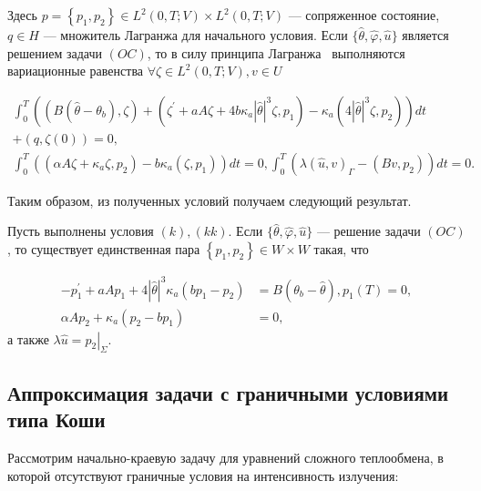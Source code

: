 Здесь $p=\left\{p_{1}, p_{2}\right\} \in L^{2}(0, T; V) \times L^{2}(0, T; V) $
— сопряженное состояние, $q \in H$ — множитель Лагранжа для начального условия.
Если $\{\widehat{\theta}, \widehat{\varphi}, \widehat{u}\}$
является решением задачи $(OC)$, то в силу принципа
Лагранжа~\cite[гл. 2, теорема 1.5]{10} выполняются вариационные равенства
$\forall \zeta \in L^{2}(0, T ; V), v \in U$

\[
    \begin{gathered}
        \int_{0}^{T}\left(\left(B\left(\widehat{\theta}-\theta_{b}\right),
        \zeta\right)+\left(\zeta^{\prime}
        +a A \zeta+4 b \kappa_{a}|\widehat{\theta}|^{3} \zeta, p_{1}\right)
        - \kappa_{a}\left(4|\widehat{\theta}|^{3} \zeta,
        p_{2}\right)\right) d t \\
        +(q, \zeta(0))=0, \\
        \int_{0}^{T}\left(\left(\alpha A \zeta
        +\kappa_{a} \zeta, p_{2}\right)
        -b \kappa_{a}\left(\zeta, p_{1}\right)\right) d t=0,
        \int_{0}^{T}\left(\lambda(\widehat{u}, v)_{\Gamma}
        -\left(B v, p_{2}\right)\right) d t=0.
    \end{gathered}
\]

Таким образом, из полученных условий получаем следующий результат.

\begin{theorem}
    \label{th:2_3:2}
    Пусть выполнены условия $(k), (kk)$.
    Если $\{\widehat{\theta}, \widehat{\varphi}, \widehat{u}\}$ — решение задачи $(OC)$,
    то существует единственная пара $\left\{p_ {1}, p_{2}\right\} \in W \times W$ такая, что

    \begin{equation}
        \label{eq:2_3:15}
        \begin{aligned}
            -p_{1}^{\prime}+a A p_{1}+4|\widehat{\theta}|^{3} \kappa_{a}\left(b p_{1}
            -p_{2}\right)&=B\left(\theta_{b}-\widehat{\theta}\right),
            p_{1}(T)=0, \\
            \alpha A p_{2}+\kappa_{a}\left(p_{2}-b p_{1}\right)&=0,
        \end{aligned}
    \end{equation}
    а также $\lambda \widehat{u}=\left.p_{2}\right|_{\Sigma}$.
\end{theorem}

\subsection{Аппроксимация задачи с граничными условиями типа Коши}
\label{subsec:ch2/sec3/approximation}
Рассмотрим начально-краевую задачу для уравнений сложного
теплообмена, в которой отсутствуют граничные условия на интенсивность излучения:


